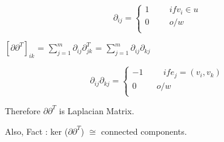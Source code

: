 \documentclass{article}
\begin{document}
   $$\partial_{ij} =
  \left\{
  \begin{array}{ll}
  1\hspace{1cm} if  v_i \in u\\
  0\hspace{1cm} o/w\\
  \end{array}
  \right.$$ 
  
  $[\partial \partial^T]_{ik} $ = $\sum_{j=1}^{m} \partial_{ij} \partial^T_{jk}$ = $\sum_{j=1}^m \partial_{ij} \partial_{kj}$
  
  $$\partial_{ij} \partial_{kj} =
  \left\{
  \begin{array}{ll}
  -1\hspace{1cm} if  e_j=(v_i,v_k)\\
  0\hspace{1cm} o/w\\
  \end{array}
  \right.$$ 
  
  Therefore $\partial\partial^T$ is Laplacian Matrix.
  
  Also, Fact : ker ($\partial\partial^T$) $\cong $ connected components.
  
\end{document}
